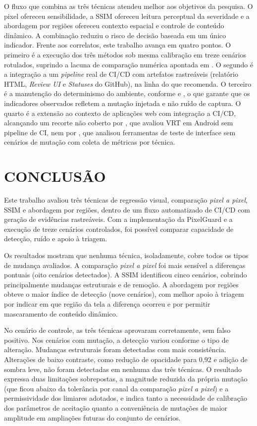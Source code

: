 \documentclass{UNESC}
\begin{document}
O fluxo que combina as três técnicas atendeu melhor aos objetivos da pesquisa. O pixel ofereceu sensibilidade, a SSIM ofereceu leitura perceptual da severidade e a abordagem por regiões ofereceu contexto espacial e controle de conteúdo dinâmico. A combinação reduziu o risco de decisão baseada em um único indicador. Frente aos correlatos, este trabalho avança em quatro pontos. O primeiro é a execução dos três métodos sob mesma calibração em treze cenários rotulados, suprindo a lacuna de comparação numérica apontada em . O segundo é a integração a um \emph{pipeline} real de CI/CD com artefatos rastreáveis (relatório HTML, \emph{Review UI} e \emph{Statuses} do GitHub), na linha do que  recomenda. O terceiro é a manutenção do determinismo do ambiente, conforme  e , o que garante que os indicadores observados refletem a mutação injetada e não ruído de captura. O quarto é a extensão ao contexto de aplicações web com integração a CI/CD, alcançando um recorte não coberto por , que avaliou VRT em Android sem pipeline de CI, nem por , que analisou ferramentas de teste de interface sem cenários de mutação com coleta de métricas por técnica.

\section{CONCLUSÃO}

Este trabalho avaliou três técnicas de regressão visual, comparação \emph{pixel a pixel}, SSIM e abordagem por regiões, dentro de um fluxo automatizado de CI/CD com geração de evidências rastreáveis. Com a implementação da PixelGuard e a execução de treze cenários controlados, foi possível comparar capacidade de detecção, ruído e apoio à triagem.

Os resultados mostram que nenhuma técnica, isoladamente, cobre todos os tipos de mudança avaliados. A comparação \emph{pixel a pixel} foi mais sensível a diferenças pontuais (oito cenários detectados). A SSIM identificou cinco cenários, cobrindo principalmente mudanças estruturais e de remoção. A abordagem por regiões obteve o maior índice de detecção (nove cenários), com melhor apoio à triagem por indicar em que região da tela a diferença ocorreu e por permitir mascaramento de conteúdo dinâmico.

No cenário de controle, as três técnicas aprovaram corretamente, sem falso positivo. Nos cenários com mutação, a detecção variou conforme o tipo de alteração. Mudanças estruturais foram detectadas com mais consistência. Alterações de baixo contraste, como redução de opacidade para 0,92 e adição de sombra leve, não foram detectadas em nenhuma das três técnicas. O resultado expressa duas limitações sobrepostas, a magnitude reduzida da própria mutação (que ficou abaixo da tolerância por canal da comparação \emph{pixel a pixel}) e a permissividade dos limiares adotados, e indica tanto a necessidade de calibração dos parâmetros de aceitação quanto a conveniência de mutações de maior amplitude em ampliações futuras do conjunto de cenários.
\end{document}
